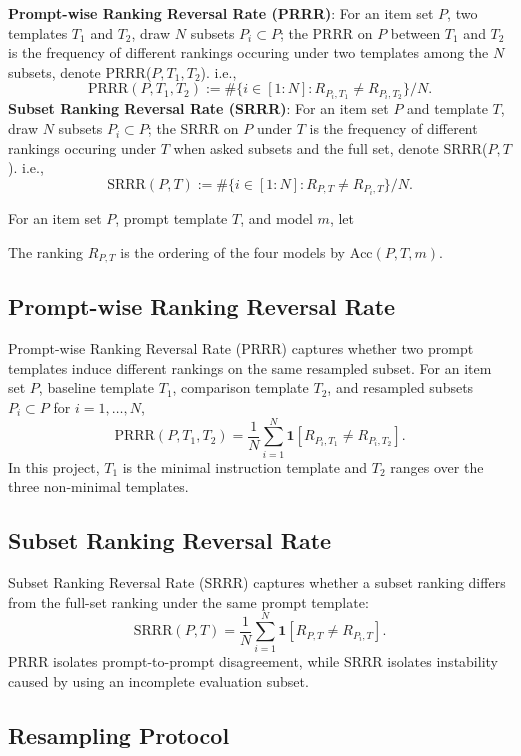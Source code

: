 \documentclass[11pt]{article}
\begin{document}
\textbf{Prompt-wise Ranking Reversal Rate (PRRR)}: For an item set $P$, two templates $T_1$ and $T_2$, draw $N$ subsets $P_i \subset P$; the PRRR on $P$ between $T_1$ and $T_2$ is the frequency of different rankings occuring under two templates among the $N$ subsets, denote PRRR($P, T_1, T_2$). i.e.,
    $$ \text{PRRR}(P, T_1, T_2):= \# \{i \in [1:N] : R_{P_i, T_1} \neq R_{P_i, T_2}\} / N.$$
     \textbf{Subset Ranking Reversal Rate (SRRR)}: For an item set $P$ and template $T$, draw $N$ subsets $P_i \subset P$; the SRRR on $P$ under $T$ is the frequency of different rankings occuring under $T$ when asked subsets and the full set, denote SRRR($P, T$). i.e.,
    $$\text{SRRR}(P, T) := \# \{i \in [1:N] : R_{P,T} \neq R_{P_i,T}\} / N.$$

For an item set $P$, prompt template $T$, and model $m$, let

 The ranking $R_{P,T}$ is the ordering of the four models by $\mathrm{Acc}(P,T,m)$.

\subsection{Prompt-wise Ranking Reversal Rate}

Prompt-wise Ranking Reversal Rate (PRRR) captures whether two prompt templates induce different rankings on the same resampled subset. For an item set $P$, baseline template $T_1$, comparison template $T_2$, and resampled subsets $P_i\subset P$ for $i=1,\ldots,N$,
\[
\mathrm{PRRR}(P,T_1,T_2)
=
\frac{1}{N}
\sum_{i=1}^{N}
\mathbf{1}\left[R_{P_i,T_1}\neq R_{P_i,T_2}\right].
\]
In this project, $T_1$ is the minimal instruction template and $T_2$ ranges over the three non-minimal templates.

\subsection{Subset Ranking Reversal Rate}

Subset Ranking Reversal Rate (SRRR) captures whether a subset ranking differs from the full-set ranking under the same prompt template:
\[
\mathrm{SRRR}(P,T)
=
\frac{1}{N}
\sum_{i=1}^{N}
\mathbf{1}\left[R_{P,T}\neq R_{P_i,T}\right].
\]
PRRR isolates prompt-to-prompt disagreement, while SRRR isolates instability caused by using an incomplete evaluation subset.

\subsection{Resampling Protocol}
\end{document}
